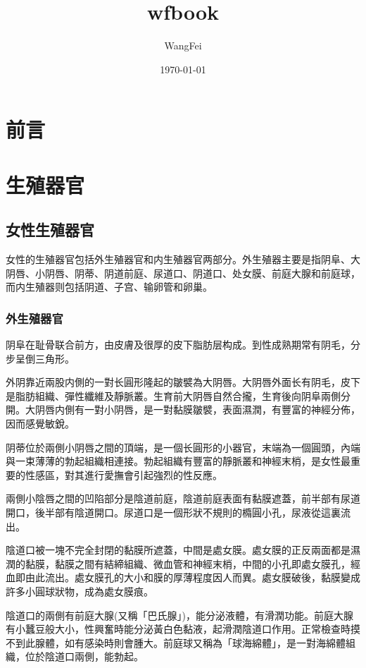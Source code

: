 \documentclass[12pt,UTF8]{ctexbook}
\title{\heiti\zihao{0} wfbook}
\author{WangFei}
\date{\today}
\begin{document}
\maketitle
\tableofcontents

\frontmatter

\chapter{前言}



\mainmatter

\chapter{生殖器官}

\section{女性生殖器官}

女性的生殖器官包括外生殖器官和内生殖器官两部分。外生殖器主要是指阴阜、大阴唇、小阴唇、阴蒂、阴道前庭、尿道口、阴道口、处女膜、前庭大腺和前庭球，而内生殖器则包括阴道、子宫、输卵管和卵巢。

\subsection{外生殖器官}

阴阜在耻骨联合前方，由皮膚及很厚的皮下脂肪层构成。到性成熟期常有阴毛，分步呈倒三角形。

外阴靠近兩股内側的一對长圓形隆起的皺襞為大阴唇。大阴唇外面长有阴毛，皮下是脂肪組織、彈性纖維及靜脈叢。生育前大阴唇自然合攏，生育後向阴阜兩側分開。大阴唇内側有一對小阴唇，是一對黏膜皺襞，表面濕潤，有豐富的神經分佈，因而感覺敏銳。

阴蒂位於兩側小阴唇之間的頂端，是一個长圓形的小器官，末端為一個圓頭，內端與一束薄薄的勃起組織相連接。勃起組織有豐富的靜脈叢和神經末梢，是女性最重要的性感區，對其進行愛撫會引起強烈的性反應。

兩側小陰唇之間的凹陷部分是陰道前庭，陰道前庭表面有黏膜遮蓋，前半部有尿道開口，後半部有陰道開口。尿道口是一個形狀不規則的橢圓小孔，尿液從這裏流出。

陰道口被一塊不完全封閉的黏膜所遮蓋，中間是處女膜。處女膜的正反兩面都是濕潤的黏膜，黏膜之間有結締組織、微血管和神經末梢，中間的小孔即處女膜孔，經血即由此流出。處女膜孔的大小和膜的厚薄程度因人而異。處女膜破後，黏膜變成許多小圓球狀物，成為處女膜痕。

陰道口的兩側有前庭大腺(又稱「巴氏腺」)，能分泌液體，有滑潤功能。前庭大腺有小蠶豆般大小，性興奮時能分泌黃白色黏液，起滑潤陰道口作用。正常檢查時摸不到此腺體，如有感染時則會腫大。前庭球又稱為「球海綿體」，是一對海綿體組織，位於陰道口兩側，能勃起。
\end{document}
